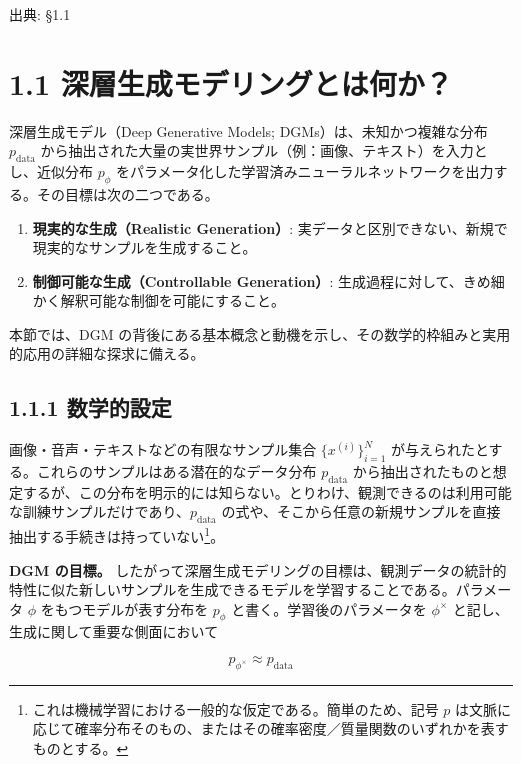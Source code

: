 

{\color{gray}\footnotesize 出典: §1.1\par}
\vspace{0.2em}

\section*{1.1 深層生成モデリングとは何か？}


深層生成モデル（Deep Generative Models; DGMs）は、未知かつ複雑な分布 $p_{\mathrm{data}}$ から抽出された大量の実世界サンプル（例：画像、テキスト）を入力とし、近似分布 $p_\phi$ をパラメータ化した学習済みニューラルネットワークを出力する。その目標は次の二つである。

\begin{enumerate}
\item \textbf{現実的な生成（Realistic Generation）}: 実データと区別できない、新規で現実的なサンプルを生成すること。
\item \textbf{制御可能な生成（Controllable Generation）}: 生成過程に対して、きめ細かく解釈可能な制御を可能にすること。
\end{enumerate}


本節では、DGM の背後にある基本概念と動機を示し、その数学的枠組みと実用的応用の詳細な探求に備える。

\subsection*{1.1.1 数学的設定}


画像・音声・テキストなどの有限なサンプル集合 $\{x^{(i)}\}_{i=1}^{N}$ が与えられたとする。これらのサンプルはある潜在的なデータ分布 $p_{\mathrm{data}}$ から抽出されたものと想定するが、この分布を明示的には知らない。とりわけ、観測できるのは利用可能な訓練サンプルだけであり、$p_{\mathrm{data}}$ の式や、そこから任意の新規サンプルを直接抽出する手続きは持っていない\footnote{これは機械学習における一般的な仮定である。簡単のため、記号 $p$ は文脈に応じて確率分布そのもの、またはその確率密度／質量関数のいずれかを表すものとする。}。

\textbf{DGM の目標。} したがって深層生成モデリングの目標は、観測データの統計的特性に似た新しいサンプルを生成できるモデルを学習することである。パラメータ $\phi$ をもつモデルが表す分布を $p_\phi$ と書く。学習後のパラメータを $\phi^\times$ と記し、生成に関して重要な側面において

\[
p_{\phi^\times} \approx p_{\mathrm{data}}
\]


